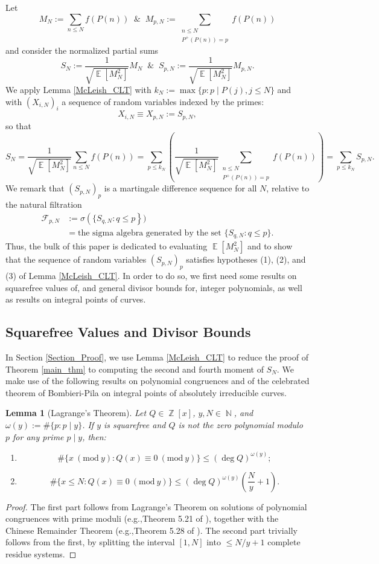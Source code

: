 \documentclass[11pts]{amsart}
\numberwithin{equation}{section}
\newtheorem{lem}{Lemma}[section]
\DeclareMathOperator{\E}{\mathbb{E}}
\DeclareMathOperator{\Z}{\mathbb{Z}}
\DeclareMathOperator{\N}{\mathbb{N}}
\newcommand{\Mod}[1]{\ (\text{mod}\ #1)}
\begin{document}
Let 
\[
M_N:=\sum_{n\leq N}f(P(n))\;\;\&\;\;M_{p,N}:=\sum_{\substack{{n\leq N}\\{P^+(P(n))=p}}}f(P(n))
\]
and consider the normalized partial sums
\[
S_N:=\frac{1}{\sqrt{\E\left[M_N^2\right]}}M_N\;\;\&\;\;S_{p,N}:=\frac{1}{\sqrt{\E\left[M_N^2\right]}}M_{p,N}.
\]
We apply Lemma \ref{McLeish_CLT} with $k_N:=\max\{p:p\mid P(j),j\leq N\}$ and with $(X_{i,N})_i$ a sequence of random variables indexed by the primes:
\[
X_{i,N} 
\equiv
X_{p,N}
:=
S_{p,N},
\]
so that
\[
S_N
=
\frac{1}{\sqrt{\E\left[M_N^2\right]}}\sum_{n\leq N}f(P(n))
=
\sum_{p\leq k_N}\left(\frac{1}{\sqrt{\E\left[M_N^2\right]}}\sum_{\substack{{n\leq N}\\{P^+(P(n))=p}}}f(P(n))\right)
=
\sum_{p\leq k_N} S_{p,N}.
\]
We remark that $(S_{p,N})_p$ is a martingale difference sequence for all $N$, relative to the natural filtration
\begin{align*}
\mathcal{F}_{p,N}
&:=\sigma\left(\{S_{q,N}:q\leq p\right\})\\
&=
\text{the sigma algebra generated by the set $\{S_{q,N}:q\leq p\}$}.
\end{align*}
Thus, the bulk of this paper 
is dedicated to evaluating $\E\left[M_N^2\right]$ and to show that the sequence of random variables $(S_{p,N})_p$ satisfies hypotheses (1), (2), and (3) of Lemma \ref{McLeish_CLT}. In order to do so, we first need some results on squarefree values of, and general divisor bounds for, integer polynomials, as well as results on integral points of curves. 

\subsection{Squarefree Values and Divisor Bounds}

In Section \ref{Section_Proof}, we use Lemma \ref{McLeish_CLT} to reduce the proof of Theorem \ref{main_thm} to computing the second and fourth moment of $S_{N}$. We make use of the following results on polynomial congruences and of the celebrated theorem of Bombieri-Pila on integral points of absolutely irreducible curves.

\begin{lem}[Lagrange's Theorem]
\label{Lagrange_Prime}
Let $Q\in\Z[x]$, $y,N\in\N$, and $\omega(y):=\#\{p:p\mid y\}$. If $y$ is squarefree and $Q$ is not the zero polynomial modulo $p$ for any prime $p\mid y$, then:
    \begin{enumerate}
        \item $$\#\{x\Mod{y}:  Q(x)\equiv 0\Mod{y}\}\leq (\deg Q)^{\omega(y)};$$
        \item $$\#\{x\leq N:  Q(x)\equiv 0\Mod{y}\}\leq (\deg Q)^{\omega(y)}\left(\frac{N}{y}+1\right).$$
    \end{enumerate}
\end{lem}
\begin{proof}
    The first part follows from Lagrange's Theorem on solutions of polynomial congruences with prime moduli (e.g.,\;Theorem 5.21 of \cite{Apo}), together with the Chinese Remainder Theorem (e.g.,\;Theorem 5.28 of \cite{Apo}). The second part trivially follows from the first, by splitting the interval $[1,N]$ into $\leq N/y+1$ complete residue systems.
\end{proof}
\end{document}
